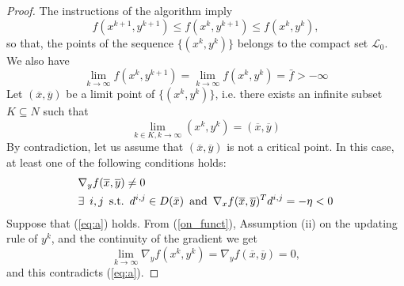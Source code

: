\begin{proof}
The instructions of the algorithm imply
$$
f(x^{k+1}, y^{k+1})\le f(x^{k}, y^{k+1}) \leq f(x^{k}, y^{k}),
$$
so that, the points of the sequence $\{(x^{k}, y^{k})\}$ belongs to the compact set $\mathcal{L}_0$.
We also have
\begin{equation}\label{on_funct}
 \lim_{k\to\infty} f(x^k,y^{k+1})=\lim_{k\to\infty} f(x^{k},y^{k})=\bar f>-\infty
\end{equation}
Let $(\overline{x},\overline{y})$ be a limit point of $\{(x^k, y^k)\}$, i.e. there exists an infinite subset $K \subseteq N$ such that
\begin{equation}\label{eq:asim}
\lim_{k \in K, k \rightarrow \infty} (x^k, y^k) = (\overline{x},\overline{y})
\end{equation}
By contradiction, let us assume that $(\overline{x},\overline{y})$ is not a critical point. 
In this case, at least one of the following conditions holds:
\begin{subequations}
\begin{align}
&\nabla_y f(\overline{x},\overline{y}) \neq 0  \label{eq:a}\\
&\exists \enskip i, j \enskip  \text{s.t.} \enskip d^{i,j}\in D(\bar x) \enskip  \text{and} \enskip  \nabla_x f(\overline{x},\overline{y})^T d^{i,j} = -\eta < 0 \label{eq:b}
\end{align}
\end{subequations}
Suppose that (\ref{eq:a}) holds.
From (\ref{on_funct}), Assumption (ii) on the updating rule of $y^k$, and the continuity of the gradient we get
$$
\lim_{k\to\infty}\nabla_y f(x^k,y^k)=\nabla_y f(\overline{x},\overline{y})=0,
$$
and this contradicts (\ref{eq:a}).


\end{proof}
